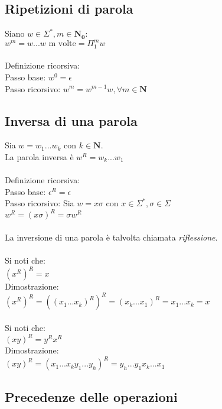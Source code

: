 \documentclass[]{article}
\begin{document}
\subsection{Ripetizioni di parola}

Siano \mbox{$ w \in \Sigma^*, m \in \mathbf{N_0} $}:
\\
\mbox{$ w^m = w ... w \text{ m volte} = \Pi_1^m w $}
\\
\\
Definizione ricorsiva:
\\
Passo base: \mbox{$ w^0 = \epsilon $}
\\
Passo ricorsivo: \mbox{$ w^m = w^{m-1} w, \forall m \in \mathbf{N} $}



\subsection{Inversa di una parola}

Sia \mbox{$w = w_1...w_k$} con \mbox{$k \in \mathbf{N}$}.
\\
La parola inversa è \mbox{$w^R = w_k...w_1$}
\\
\\
Definizione ricorsiva:
\\
Passo base: \mbox{$\epsilon^R = \epsilon$}
\\
Passo ricorsivo: Sia \mbox{$w = x \sigma$} con \mbox{$x \in \Sigma^*, \sigma \in \Sigma$}
\\
\mbox{$w^R = (x \sigma)^R = \sigma w^R$}
\\
\\
La inversione di una parola è talvolta chiamata \textit{riflessione}.
\\
\\
Si noti che:
\\
\mbox{$ (x^R)^R = x $}
\\
Dimostrazione:
\\
\mbox{$ (x^R)^R = ((x_1...x_k)^R)^R = (x_k...x_1)^R = x_1...x_k = x $}
\\
\\
Si noti che:
\\
\mbox{$ (xy)^R = y^R x^R $}
\\
Dimostrazione:
\\
\mbox{$ (xy)^R = (x_1...x_k y_1...y_h)^R = y_h...y_1 x_k...x_1 $}



\subsection{Precedenze delle operazioni}
\end{document}
